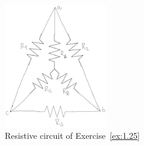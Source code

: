 \begin{figure}[h!]
  \centering
  \includegraphics[width=0.4\textwidth]{"images/Fig-04"}
  \caption{Resistive circuit of Exercise~\ref{ex:1.25}} 
  \label{Fig:Ex:1.25}
\end{figure}

